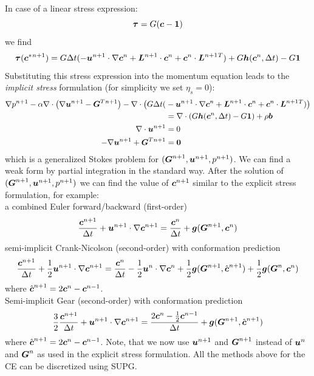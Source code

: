 In case of a linear stress expression:
\begin{equation}
     \boldsymbol{\tau}=G(\boldsymbol{c} - \boldsymbol{1})
\end{equation}
we find
\begin{equation}
   \boldsymbol{\tau}(\boldsymbol{c}^*{}^{n+1})=
   G\Delta t(-\boldsymbol{u}^{n+1}\cdot\nabla\boldsymbol{c}^n+
       \boldsymbol{L}^{n+1}\cdot\boldsymbol{c}^n+\boldsymbol{c}^n\cdot\boldsymbol{L}^{n+1}{}^T)
+G\boldsymbol{h}(\boldsymbol{c}^n,\Delta t) -G\boldsymbol{1}
  \label{eq:stress_IS}
\end{equation}
Substituting this stress expression into the momentum equation leads to the
\emph{implicit stress} formulation (for simplicity we set $\eta_s=0$):
\begin{align}
      \nabla p^{n+1} 
  -\alpha\nabla\cdot\big(\nabla\boldsymbol{u}^{n+1} -\boldsymbol{G}^T{}^{n+1} \big)
  -\nabla\cdot\big(G\Delta t(&-\boldsymbol{u}^{n+1}\cdot\nabla\boldsymbol{c}^n+
        \boldsymbol{L}^{n+1}\cdot\boldsymbol{c}^n+
      \boldsymbol{c}^n\cdot\boldsymbol{L}^{n+1}{}^T)\big)\notag\\
&=\nabla\cdot( G\boldsymbol{h}(\boldsymbol{c}^n,\Delta t) -G\boldsymbol{1})
        + \rho\boldsymbol{b}\label{eq:mombal_IS}\\
     \nabla\cdot\boldsymbol{u}^{n+1}&=0\\
   -\nabla\boldsymbol{u}^{n+1} + \boldsymbol{G}^T{}^{n+1} &= \boldsymbol{0}
\end{align}
which is a generalized Stokes problem for
$(\boldsymbol{G}^{n+1},\boldsymbol{u}^{n+1},p^{n+1})$. We can find
a weak form by partial integration in the standard way. After the solution of
$(\boldsymbol{G}^{n+1},\boldsymbol{u}^{n+1},p^{n+1})$ we can find 
the value of $\boldsymbol{c}^{n+1}$ similar to
the explicit stress formulation, for example:\\
a combined Euler forward/backward (first-order)
\begin{equation}
 \frac{\boldsymbol{c}^{n+1}}{\Delta t}+\boldsymbol{u}^{n+1}\cdot\nabla\boldsymbol{c}^{n+1}=
    \frac{\boldsymbol{c}^{n}}{\Delta t} +\boldsymbol{g}(\boldsymbol{G}^{n+1},\boldsymbol{c}^n)
   \label{eq:Eulerimp}
\end{equation}
semi-implicit Crank-Nicolson (second-order) with conformation prediction
\begin{equation}
 \frac{\boldsymbol{c}^{n+1}}{\Delta t}+\frac12{\boldsymbol{u}}^{n+1}\cdot\nabla\boldsymbol{c}^{n+1}=
 \frac{\boldsymbol{c}^{n}}{\Delta t}
-\frac12\boldsymbol{u}^n\cdot\nabla\boldsymbol{c}^n
+\frac12\boldsymbol{g}(\boldsymbol{G}^{n+1},\hat{\boldsymbol{c}}^{n+1})
 +\frac12\boldsymbol{g}(\boldsymbol{G}^{n},\boldsymbol{c}^{n})
   \label{eq:CNimp}
\end{equation}
where $\hat{\boldsymbol{c}}^{n+1}=2\boldsymbol{c}^n-\boldsymbol{c}^{n-1}$.\\
Semi-implicit Gear (second-order) with conformation prediction
\begin{equation}
\frac32 \frac{\boldsymbol{c}^{n+1}}{\Delta t}+{\boldsymbol{u}}^{n+1}\cdot\nabla\boldsymbol{c}^{n+1}=
 \frac{2\boldsymbol{c}^{n}-\frac12\boldsymbol{c}^{n-1}}{\Delta t} +
\boldsymbol{g}(\boldsymbol{G}^{n+1},\hat{\boldsymbol{c}}^{n+1})
   \label{eq:Gearimp}
\end{equation}
where $\hat{\boldsymbol{c}}^{n+1}=2\boldsymbol{c}^n-\boldsymbol{c}^{n-1}$. 
Note, that we now use $\boldsymbol{u}^{n+1}$ and $\boldsymbol{G}^{n+1}$ instead of $\boldsymbol{u}^{n}$
and $\boldsymbol{G}^{n}$ as used in the explicit stress formulation.
All the methods above for the CE can be discretized using SUPG.


